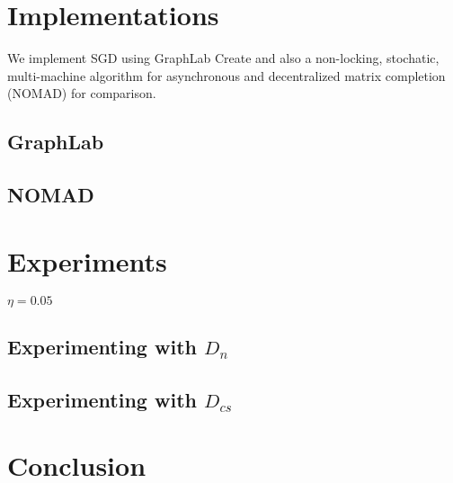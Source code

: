 \documentclass{article} %
\begin{document}
\section{Implementations}
We implement SGD using GraphLab Create and also a non-locking, stochatic, multi-machine algorithm for asynchronous and decentralized matrix completion (NOMAD) \cite{yun2013nomad} for comparison.
\subsection{GraphLab}
\subsection{NOMAD}
\section{Experiments}

$\eta=0.05$

\subsection{Experimenting with $D_n$}

\subsection{Experimenting with $D_{cs}$}


\section{Conclusion}



{}
\end{document}
